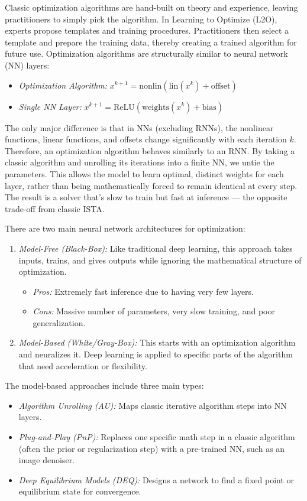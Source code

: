 \documentclass[conference]{IEEEtran}
\begin{document}
Classic optimization algorithms are hand-built on theory and experience, leaving practitioners to simply pick the algorithm. In Learning to Optimize (L2O), experts propose templates and training procedures. Practitioners then select a template and prepare the training data, thereby creating a trained algorithm for future use. Optimization algorithms are structurally similar to neural network (NN) layers:
\begin{itemize}
    \item \textit{Optimization Algorithm:} $x^{k+1} = \text{nonlin}(\text{lin}(x^{k})+\text{offset})$
    \item \textit{Single NN Layer:} $x^{k+1} = \text{ReLU}(\text{weights}(x^{k})+\text{bias})$
\end{itemize}
The only major difference is that in NNs (excluding RNNs), the nonlinear functions, linear functions, and offsets change significantly with each iteration $k$. Therefore, an optimization algorithm behaves similarly to an RNN. By taking a classic algorithm and unrolling its iterations into a finite NN, we untie the parameters. This allows the model to learn optimal, distinct weights for each layer, rather than being mathematically forced to remain identical at every step. The result is a solver that's slow to train but fast at inference — the opposite trade-off from classic ISTA.

There are two main neural network architectures for optimization:
\begin{enumerate}
    \item \textit{Model-Free (Black-Box):} Like traditional deep learning, this approach takes inputs, trains, and gives outputs while ignoring the mathematical structure of optimization.
    \begin{itemize}
        \item \textit{Pros:} Extremely fast inference due to having very few layers.
        \item \textit{Cons:} Massive number of parameters, very slow training, and poor generalization.
    \end{itemize}
    \item \textit{Model-Based (White/Gray-Box):} This starts with an optimization algorithm and neuralizes it. Deep learning is applied to specific parts of the algorithm that need acceleration or flexibility.
\end{enumerate}

The model-based approaches include three main types:
\begin{itemize}
    \item \textit{Algorithm Unrolling (AU):} Maps classic iterative algorithm steps into NN layers.
    \item \textit{Plug-and-Play (PnP):} Replaces one specific math step in a classic algorithm (often the prior or regularization step) with a pre-trained NN, such as an image denoiser.
    \item \textit{Deep Equilibrium Models (DEQ):} Designs a network to find a fixed point or equilibrium state for convergence.
\end{itemize}
\end{document}

